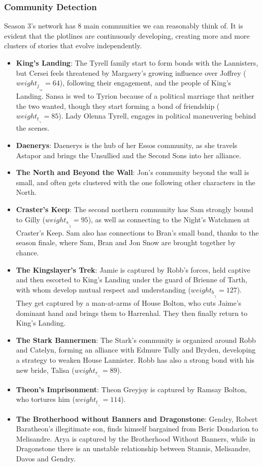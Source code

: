\documentclass[10pt,twocolumn,letterpaper]{article}
\begin{document}
\subsubsection{Community Detection}

Season 3's network has 8 main communities we can reasonably think of. It is evident that the plotlines are continuously developing, creating more and more clusters of stories that evolve independently.

\begin{itemize}
    \item \textbf{King's Landing}: The Tyrell family start to form bonds with the Lannisters, but Cersei feels threatened by Margaery's growing influence over Joffrey ($weight_j_,_m=64$), following their engagement, and the people of King's Landing. Sansa is wed to Tyrion because of a political marriage that neither the two wanted, though they start forming a bond of friendship ($weight_t_,_s=85$). Lady Olenna Tyrell, engages in political maneuvering behind the scenes. 
    \item \textbf{Daenerys}: Daenerys is the hub of her Essos community, as she travels Astapor and brings the Unsullied and the Second Sons into her alliance.
    \item \textbf{The North and Beyond the Wall}: Jon's community beyond the wall is small, and often gets clustered with the one following other characters in the North.
    \item \textbf{Craster's Keep}: The second northern community has Sam strongly bound to Gilly ($weight_s_,_g=95$), as well as connecting to the Night’s Watchmen at Craster’s Keep. Sam also has connections to Bran’s small band, thanks to the season finale, where Sam, Bran and Jon Snow are brought together by chance.
    \item \textbf{The Kingslayer's Trek}: Jamie is captured by Robb's forces, held captive and then escorted to King's Landing under the guard of Brienne of Tarth, with whom develop mutual respect and understanding ($weight_b_,_j=127$). They get captured by a man-at-arms of House Bolton, who cuts Jaime's dominant hand and brings them to Harrenhal. They then finally return to King's Landing. 
    \item \textbf{The Stark Bannermen}: The Stark's community is organized around Robb and Catelyn, forming an alliance with Edmure Tully and Bryden, developing a strategy to weaken House Lannister. Robb has also a strong bond with his new bride, Talisa ($weight_r_,_t=89$).
    \item \textbf{Theon's Imprisonment}: Theon Greyjoy is captured by Ramsay Bolton, who tortures him ($weight_t_,_r=114$).
    \item \textbf{The Brotherhood without Banners and Dragonstone}: Gendry, Robert Baratheon's illegitimate son, finds himself bargained from Beric Dondarion to Melisandre. Arya is captured by the Brotherhood Without Banners, while in Dragonstone there is an unstable relationship between Stannis, Melisandre, Davos and Gendry. 
\end{itemize}
\end{document}
